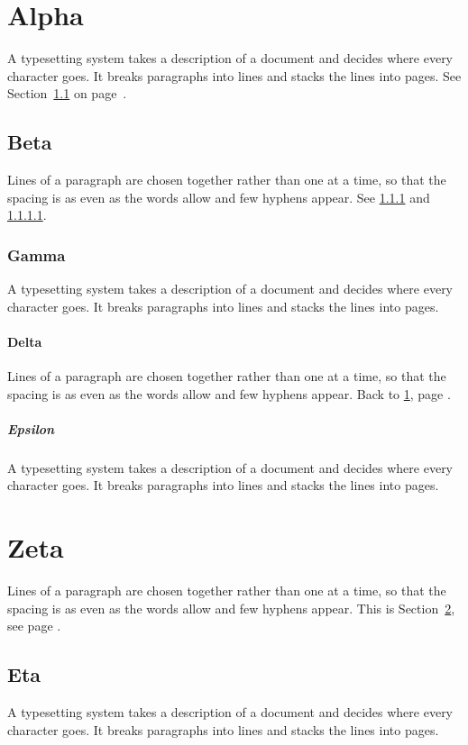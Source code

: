 \documentclass{article}
\begin{document}
\section{Alpha}\label{sec:a}
A typesetting system takes a description of a document and decides where every character goes. It breaks paragraphs into lines and stacks the lines into pages. See Section~\ref{sec:b} on page~\pageref{sec:b}.
\subsection{Beta}\label{sec:b}
Lines of a paragraph are chosen together rather than one at a time, so that the spacing is as even as the words allow and few hyphens appear. See \ref{sec:c} and \ref{sec:d}.
\subsubsection{Gamma}\label{sec:c}
A typesetting system takes a description of a document and decides where every character goes. It breaks paragraphs into lines and stacks the lines into pages.
\paragraph{Delta}\label{sec:d} Lines of a paragraph are chosen together rather than one at a time, so that the spacing is as even as the words allow and few hyphens appear. Back to \ref{sec:a}, page \pageref{sec:a}.
\subparagraph{Epsilon} A typesetting system takes a description of a document and decides where every character goes. It breaks paragraphs into lines and stacks the lines into pages.
\section{Zeta}\label{sec:e}
Lines of a paragraph are chosen together rather than one at a time, so that the spacing is as even as the words allow and few hyphens appear. This is Section~\ref{sec:e}, see page \pageref{sec:d}.
\subsection{Eta}
A typesetting system takes a description of a document and decides where every character goes. It breaks paragraphs into lines and stacks the lines into pages.
\end{document}
